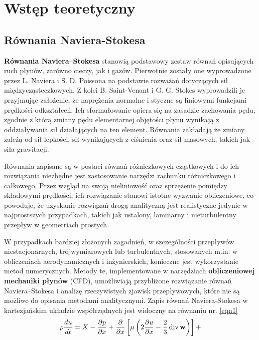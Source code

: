 \documentclass{article}
\begin{document}
\newpage
\section{Wstęp teoretyczny}
\subsection{Równania Naviera-Stokesa}
\textbf{Równania Naviera–Stokesa} stanowią podstawowy zestaw równań opisujących ruch płynów, zarówno cieczy, jak i gazów. Pierwotnie zostały one wyprowadzone przez L. Naviera i S. D. Poissona\cite{navier} na podstawie rozważań dotyczących sił międzycząsteczkowych. Z kolei B. Saint-Venant i G. G. Stokes\cite{stokes} wyprowadzili je przyjmując założenie, że naprężenia normalne i styczne są liniowymi funkcjami prędkości odkształceń.\newline\newline
Ich sformułowanie opiera się na zasadzie zachowania pędu, zgodnie z którą zmiany pędu elementarnej objętości płynu wynikają z oddziaływania sił działających na ten element. 
Równania zakładają że zmiany zależą od sił lepkości, sił wynikających z ciśnienia oraz sił masowych, takich jak siła grawitacji.\newline\newline

Równania zapisane są w postaci równań różniczkowych cząstkowych i do ich rozwiązania niezbędne jest zastosowanie narzędzi rachunku różniczkowego i całkowego. 
Przez wzgląd na swoją nieliniowość oraz sprzężenie pomiędzy składowymi prędkości, ich rozwiązanie stanowi istotne wyzwanie obliczeniowe, co powoduje, 
że uzyskanie rozwiązań drogą analityczną jest realistyczne jedynie w najprostszych przypadkach, takich jak ustalony, laminarny i nieturbulentny przepływ w geometriach prostych.\newline\newline

W przypadkach bardziej złożonych zagadnień, w szczególności przepływów niestacjonarnych, trójwymiarowych lub turbulentnych, 
stosowanych m.in. w obliczeniach aerodynamicznych i inżynierskich, konieczne jest wykorzystanie metod numerycznych. 
Metody te, implementowane w narzędziach \textbf{obliczeniowej mechaniki płynów} (CFD), umożliwiają przybliżone rozwiązanie równań Naviera–Stokesa i analizę rzeczywistych zjawisk przepływowych, 
które nie są możliwe do opisania metodami analitycznymi.\newline\newline
\noindent
Zapis równań Naviera-Stokesa w kartezjańskim układzie współrzędnych jest widoczny na równaniu nr. \ref{eqn1}\newline
\begin{equation}\label{eqn1}\\ 
\rho 
\frac{du }{dt }
= X 
- \frac{\partial  p }{\partial x }
+ \frac \partial {\partial  x }
\left [ 
    \mu \left ( 
        2 \frac{\partial u }{\partial  x }
        - { \frac{2}{3} }  \mathop{\rm div}  \mathbf w 
    \right )  
\right ] 
+
\end{equation}
\end{document}
